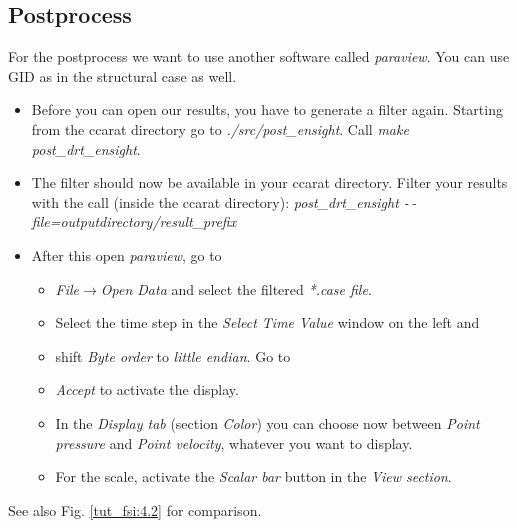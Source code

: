 \subsection{Postprocess}

For the postprocess we want to use another software called \emph{paraview}. You can use GID as in the structural case as well.

\begin{itemize}
\item Before you can open our results, you have to generate a filter again. Starting from the ccarat directory go to \emph{./src/post\_ensight}. Call \emph{make post\_drt\_ensight}.
\item The filter should now be available in your ccarat directory. Filter your results with
the call (inside the ccarat directory): \emph{post\_drt\_ensight -\,-file=outputdirectory/result\_prefix}
\item After this open \emph{paraview}, go to 

\begin{itemize}
\item \emph{File$\to$Open Data} and select the filtered \emph{{*}.case
file}. 
\item Select the time step in the \emph{Select Time Value} window on the
left and 
\item shift \emph{Byte order} to \emph{little endian}. Go to 
\item \emph{Accept} to activate the display.
\item In the \emph{Display tab} (section \emph{Color}) you can choose now
between \emph{Point pressure} and \emph{Point velocity}, whatever
you want to display.
\item For the scale, activate the \emph{Scalar bar} button in the \emph{View
section}. 
\end{itemize}
\end{itemize}
See also Fig. \ref{tut_fsi:4.2} for comparison.

